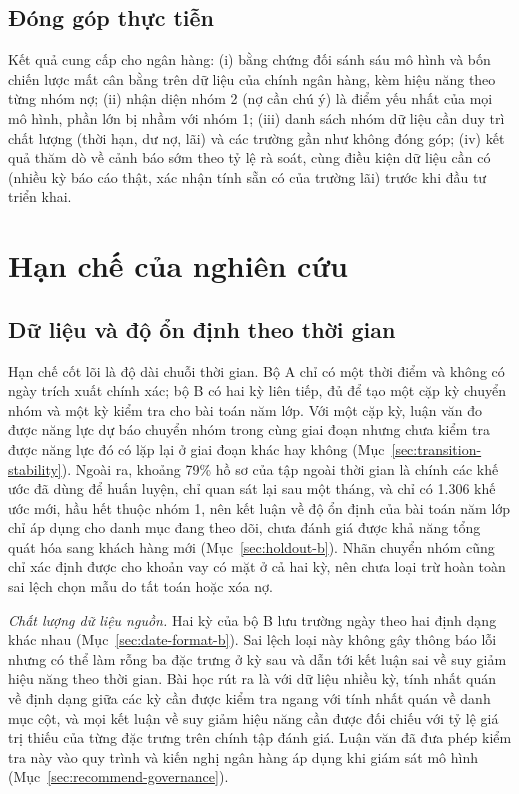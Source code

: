 \subsection{Đóng góp thực tiễn}

Kết quả cung cấp cho ngân hàng: (i) bằng chứng đối sánh sáu mô hình và bốn chiến lược mất cân bằng trên dữ liệu của chính ngân hàng, kèm hiệu năng theo từng nhóm nợ; (ii) nhận diện nhóm 2 (nợ cần chú ý) là điểm yếu nhất của mọi mô hình, phần lớn bị nhầm với nhóm 1; (iii) danh sách nhóm dữ liệu cần duy trì chất lượng (thời hạn, dư nợ, lãi) và các trường gần như không đóng góp; (iv) kết quả thăm dò về cảnh báo sớm theo tỷ lệ rà soát, cùng điều kiện dữ liệu cần có (nhiều kỳ báo cáo thật, xác nhận tính sẵn có của trường lãi) trước khi đầu tư triển khai.

\section{Hạn chế của nghiên cứu}

\subsection{Dữ liệu và độ ổn định theo thời gian}
\label{sec:limit-transition-stability}
\label{sec:limit-holdout}
\label{sec:limit-datefix}

Hạn chế cốt lõi là độ dài chuỗi thời gian. Bộ A chỉ có một thời điểm và không có ngày trích xuất chính xác; bộ B có hai kỳ liên tiếp, đủ để tạo một cặp kỳ chuyển nhóm và một kỳ kiểm tra cho bài toán năm lớp. Với một cặp kỳ, luận văn đo được năng lực dự báo chuyển nhóm trong cùng giai đoạn nhưng chưa kiểm tra được năng lực đó có lặp lại ở giai đoạn khác hay không (Mục~\ref{sec:transition-stability}). Ngoài ra, khoảng 79\% hồ sơ của tập ngoài thời gian là chính các khế ước đã dùng để huấn luyện, chỉ quan sát lại sau một tháng, và chỉ có 1.306 khế ước mới, hầu hết thuộc nhóm 1, nên kết luận về độ ổn định của bài toán năm lớp chỉ áp dụng cho danh mục đang theo dõi, chưa đánh giá được khả năng tổng quát hóa sang khách hàng mới (Mục~\ref{sec:holdout-b}). Nhãn chuyển nhóm cũng chỉ xác định được cho khoản vay có mặt ở cả hai kỳ, nên chưa loại trừ hoàn toàn sai lệch chọn mẫu do tất toán hoặc xóa nợ.

\noindent\textit{Chất lượng dữ liệu nguồn.} Hai kỳ của bộ B lưu trường ngày theo hai định dạng khác nhau (Mục~\ref{sec:date-format-b}). Sai lệch loại này không gây thông báo lỗi nhưng có thể làm rỗng ba đặc trưng ở kỳ sau và dẫn tới kết luận sai về suy giảm hiệu năng theo thời gian. Bài học rút ra là với dữ liệu nhiều kỳ, tính nhất quán về định dạng giữa các kỳ cần được kiểm tra ngang với tính nhất quán về danh mục cột, và mọi kết luận về suy giảm hiệu năng cần được đối chiếu với tỷ lệ giá trị thiếu của từng đặc trưng trên chính tập đánh giá. Luận văn đã đưa phép kiểm tra này vào quy trình và kiến nghị ngân hàng áp dụng khi giám sát mô hình (Mục~\ref{sec:recommend-governance}).

